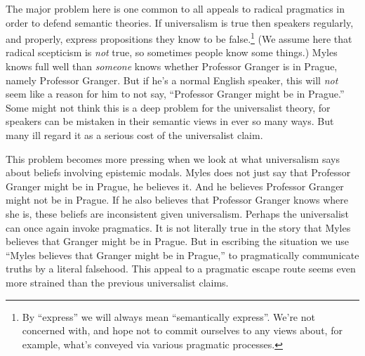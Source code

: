 The major problem here is one common to all appeals to radical pragmatics in order to defend semantic theories. If universalism is true then speakers regularly, and properly, express propositions they know to be false.\footnote{By ``express'' we will always mean ``semantically express''. We're not concerned with, and hope not to commit ourselves to any views about, for example, what's conveyed via various pragmatic processes. } (We assume here that radical scepticism is \textit{not} true, so sometimes people know some things.) Myles knows full well than \textit{someone} knows whether Professor Granger is in Prague, namely Professor Granger. But if he's a normal English speaker, this will \textit{not} seem like a reason for him to not say, ``Professor Granger might be in Prague.'' Some might not think this is a deep problem for the universalist theory, for speakers can be mistaken in their semantic views in ever so many ways. But many ill 
regard it as a serious cost of the universalist claim.
 
This problem becomes more pressing when we look at what universalism says about beliefs involving epistemic modals. Myles does not just say that Professor Granger might be in Prague, he believes it. And he believes Professor Granger might not be in Prague. If he also believes that Professor Granger knows where she is, these beliefs are inconsistent given universalism. Perhaps the universalist can once again invoke pragmatics. It is not literally true in the story that Myles believes that Granger might be in Prague. But in escribing the situation we use ``Myles believes that Granger might be in Prague,'' to pragmatically communicate truths by a literal falsehood. This appeal to a pragmatic escape route seems even more strained than the previous universalist claims.
 
